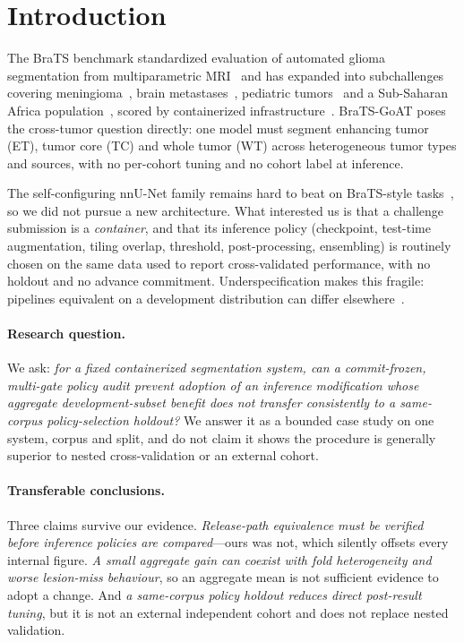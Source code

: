 \documentclass[runningheads]{llncs}
\begin{document}
\section{Introduction}
The BraTS benchmark standardized evaluation of automated glioma segmentation from multiparametric
MRI~\cite{menze2015brats,bakas2017advancing,baid2021brats} and has expanded into subchallenges
covering meningioma~\cite{bratsmen2023}, brain metastases~\cite{bratsmet2023}, pediatric
tumors~\cite{bratsped2023} and a Sub-Saharan Africa population~\cite{bratsssa2023}, scored by
containerized infrastructure~\cite{karargyris2023medperf}. BraTS-GoAT poses the cross-tumor question directly: one
model must segment enhancing tumor (ET), tumor core (TC) and whole tumor (WT) across heterogeneous
tumor types and sources, with no per-cohort tuning and no cohort label at inference.

The self-configuring nnU-Net family remains hard to beat on BraTS-style
tasks~\cite{isensee2021nnunet,isensee2024nnunetrevisited}, so we did not pursue a new architecture.
What interested us is that a challenge submission is a \emph{container}, and that its inference
policy (checkpoint, test-time augmentation, tiling overlap, threshold, post-processing,
ensembling) is routinely chosen on the same data used to report cross-validated performance, with no
holdout and no advance commitment. Underspecification makes this fragile: pipelines equivalent on a
development distribution can differ elsewhere~\cite{damour2022underspecification}.

\paragraph{Research question.} We ask: \emph{for a fixed containerized segmentation system, can a
commit-frozen, multi-gate policy audit prevent adoption of an inference modification whose aggregate
development-subset benefit does not transfer consistently to a same-corpus policy-selection
holdout?} We answer it as a bounded case study on one system, corpus and split, and do not claim it
shows the procedure is generally superior to nested cross-validation or an external cohort.

\paragraph{Transferable conclusions.} Three claims survive our evidence. \emph{Release-path
equivalence must be verified before inference policies are compared}---ours was not, which silently
offsets every internal figure. \emph{A small aggregate gain can coexist with fold heterogeneity and
worse lesion-miss behaviour}, so an aggregate mean is not sufficient evidence to adopt a change. And
\emph{a same-corpus policy holdout reduces direct post-result tuning}, but it is
not an external independent cohort and does not replace nested validation.
\end{document}

